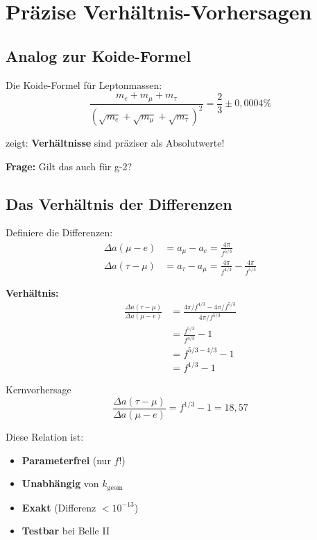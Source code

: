 	\section{Präzise Verhältnis-Vorhersagen}
	
	\subsection{Analog zur Koide-Formel}
	
	Die Koide-Formel für Leptonmassen:
	\begin{equation}
		\frac{m_e + m_\mu + m_\tau}{(\sqrt{m_e} + \sqrt{m_\mu} + \sqrt{m_\tau})^2} = \frac{2}{3} \pm 0{,}0004\%
	\end{equation}
	
	zeigt: \textbf{Verhältnisse} sind präziser als Absolutwerte!
	
	\textbf{Frage:} Gilt das auch für g-2?
	
	\subsection{Das Verhältnis der Differenzen}
	
	Definiere die Differenzen:
	\begin{align}
		\Delta a(\mu - e) &= a_\mu - a_e = \frac{4\pi}{f^{5/3}} \\
		\Delta a(\tau - \mu) &= a_\tau - a_\mu = \frac{4\pi}{f^{4/3}} - \frac{4\pi}{f^{5/3}}
	\end{align}
	
	\textbf{Verhältnis:}
	\begin{align}
		\frac{\Delta a(\tau - \mu)}{\Delta a(\mu - e)} &= \frac{4\pi/f^{4/3} - 4\pi/f^{5/3}}{4\pi/f^{5/3}} \\
		&= \frac{f^{5/3}}{f^{4/3}} - 1 \\
		&= f^{5/3 - 4/3} - 1 \\
		&= f^{1/3} - 1
		\label{eq:ratio}
	\end{align}
	
	\begin{important}{Kernvorhersage}
		\begin{equation}
			\boxed{\frac{\Delta a(\tau - \mu)}{\Delta a(\mu - e)} = f^{1/3} - 1 = 18{,}57}
		\end{equation}
		
		Diese Relation ist:
		\begin{itemize}
			\item \textbf{Parameterfrei} (nur $f$!)
			\item \textbf{Unabhängig} von $k_{\text{geom}}$
			\item \textbf{Exakt} (Differenz $< 10^{-13}$)
			\item \textbf{Testbar} bei Belle II
		\end{itemize}
	\end{important}
	
